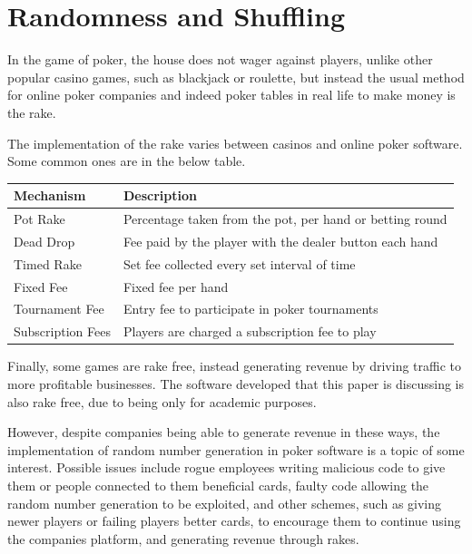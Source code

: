 \section{Randomness and Shuffling}
In the game of poker, the house does not wager against players, unlike other 
popular casino games, such as blackjack or roulette, but instead the usual 
method for online poker companies and indeed poker tables in real life to make 
money is the rake. 

The implementation of the rake varies between casinos and online poker
software. Some common ones are in the below table.

\begin{center}
    \begin{tabular}{l l}
    \toprule
    Mechanism           & Description                                               \\
    \midrule
    Pot Rake            & Percentage taken from the pot, per hand or betting round  \\ \addlinespace
    Dead Drop           & Fee paid by the player with the dealer button each hand   \\ \addlinespace
    Timed Rake          & Set fee collected every set interval of time              \\ \addlinespace
    Fixed Fee           & Fixed fee per hand                                        \\ \addlinespace
    Tournament Fee      & Entry fee to participate in poker tournaments             \\ \addlinespace
    Subscription Fees   & Players are charged a subscription fee to play            \\
    \bottomrule
    \end{tabular}
\end{center}

Finally, some games are rake free, instead generating revenue by driving
traffic to more profitable businesses. The software developed that this paper
is discussing is also rake free, due to being only for academic purposes.

However, despite companies being able to generate revenue in these ways, the
implementation of random number generation in poker software is a topic of
some interest. Possible issues include rogue employees writing malicious
code to give them or people connected to them beneficial cards, faulty code
allowing the random number generation to be exploited, and other schemes, such
as giving newer players or failing players better cards, to encourage them to 
continue using the companies platform, and generating revenue through rakes.

